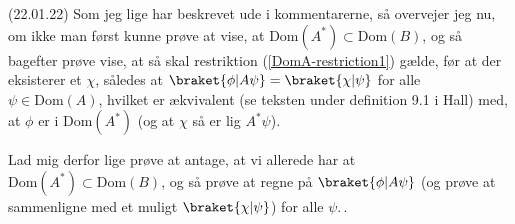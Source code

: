\documentclass{report}
\begin{document}
(22.01.22) Som jeg lige har beskrevet ude i kommentarerne, så overvejer jeg nu, om ikke man først kunne prøve at vise, at $\mathrm{Dom}(A^*) \subset \mathrm{Dom}(B)$, og så bagefter prøve vise, at så skal restriktion (\ref{DomA-restriction1}) gælde, før at der eksisterer et $\chi$, således at $\braket{\phi|A\psi} = \braket{\chi|\psi}$ for alle $\psi\in\mathrm{Dom}(A)$, hvilket er ækvivalent (se teksten under definition 9.1 i Hall) med, at $\phi$ er i Dom$(A^*)$ (og at $\chi$ så er lig $A^*\psi$). 

Lad mig derfor lige prøve at antage, at vi allerede har at $\mathrm{Dom}(A^*) \subset \mathrm{Dom}(B)$, og så prøve at regne på $\braket{\phi|A\psi}$ (og prøve at sammenligne med et muligt $\braket{\chi|\psi}$) for alle $\psi$.\,.
\end{document}
